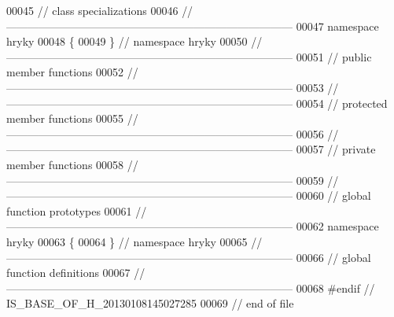 \begin{DoxyCode}
00045 \textcolor{comment}{// class specializations}
00046 \textcolor{comment}{//
      ------------------------------------------------------------------------------}
00047 \textcolor{keyword}{namespace }hryky
00048 \{
00049 \} \textcolor{comment}{// namespace hryky}
00050 \textcolor{comment}{//
      ------------------------------------------------------------------------------}
00051 \textcolor{comment}{// public member functions}
00052 \textcolor{comment}{//
      ------------------------------------------------------------------------------}
00053 \textcolor{comment}{//
      ------------------------------------------------------------------------------}
00054 \textcolor{comment}{// protected member functions}
00055 \textcolor{comment}{//
      ------------------------------------------------------------------------------}
00056 \textcolor{comment}{//
      ------------------------------------------------------------------------------}
00057 \textcolor{comment}{// private member functions}
00058 \textcolor{comment}{//
      ------------------------------------------------------------------------------}
00059 \textcolor{comment}{//
      ------------------------------------------------------------------------------}
00060 \textcolor{comment}{// global function prototypes}
00061 \textcolor{comment}{//
      ------------------------------------------------------------------------------}
00062 \textcolor{keyword}{namespace }hryky
00063 \{
00064 \} \textcolor{comment}{// namespace hryky}
00065 \textcolor{comment}{//
      ------------------------------------------------------------------------------}
00066 \textcolor{comment}{// global function definitions}
00067 \textcolor{comment}{//
      ------------------------------------------------------------------------------}
00068 \textcolor{preprocessor}{#endif // IS\_BASE\_OF\_H\_20130108145027285}
00069 \textcolor{preprocessor}{}\textcolor{comment}{// end of file}
\end{DoxyCode}
